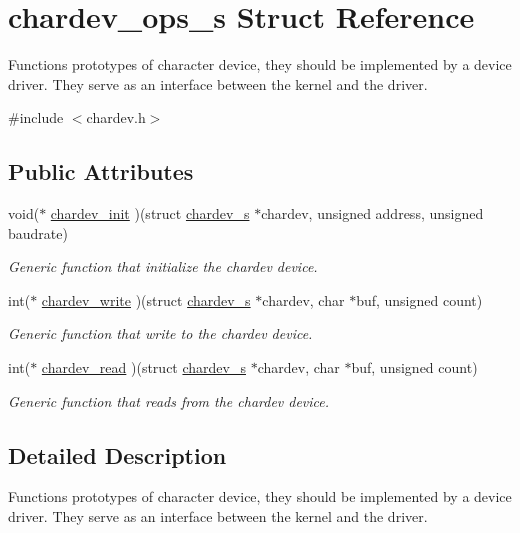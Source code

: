 \hypertarget{structchardev__ops__s}{\section{chardev\-\_\-ops\-\_\-s Struct Reference}
\label{structchardev__ops__s}
}


Functions prototypes of character device, they should be implemented by a device driver. They serve as an interface between the kernel and the driver.  




{\ttfamily \#include $<$chardev.\-h$>$}

\subsection*{Public Attributes}
\begin{DoxyCompactItemize}
\item 
void($\ast$ \hyperlink{structchardev__ops__s_acde8ff309c1553a2209756737f2b2d31}{chardev\-\_\-init} )(struct \hyperlink{structchardev__s}{chardev\-\_\-s} $\ast$chardev, unsigned address, unsigned baudrate)
\begin{DoxyCompactList}\small\item\em Generic function that initialize the chardev device. \end{DoxyCompactList}\item 
int($\ast$ \hyperlink{structchardev__ops__s_a2e4cf779f0295cc24fb52cfd53b3cd29}{chardev\-\_\-write} )(struct \hyperlink{structchardev__s}{chardev\-\_\-s} $\ast$chardev, char $\ast$buf, unsigned count)
\begin{DoxyCompactList}\small\item\em Generic function that write to the chardev device. \end{DoxyCompactList}\item 
int($\ast$ \hyperlink{structchardev__ops__s_a5313da07e348354aa0f29c0a4f7f7511}{chardev\-\_\-read} )(struct \hyperlink{structchardev__s}{chardev\-\_\-s} $\ast$chardev, char $\ast$buf, unsigned count)
\begin{DoxyCompactList}\small\item\em Generic function that reads from the chardev device. \end{DoxyCompactList}\end{DoxyCompactItemize}


\subsection{Detailed Description}
Functions prototypes of character device, they should be implemented by a device driver. They serve as an interface between the kernel and the driver. 

